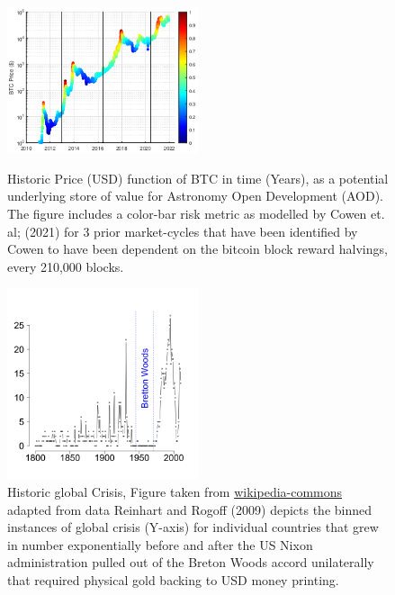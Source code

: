\documentclass[final,5p,times,twocolumn,authoryear]{elsarticle}
\begin{document}
 \begin{figure}[h!]
  \centering
  \caption{Historic Price (USD) function of BTC in time (Years), as a potential underlying store of value for Astronomy Open Development (AOD). The figure includes a color-bar risk metric as modelled by Cowen et. al; (2021) for 3 prior market-cycles that have been identified by Cowen to have been dependent on the bitcoin block reward halvings, every 210,000 blocks.}
  \includegraphics[width=0.5\textwidth]{figs/cowen2.eps}
  \label{fig:cowen}
  \end{figure}

\begin{figure}[h!]
    \centering
  \caption{Historic global Crisis, Figure taken from \href{https://en.wikipedia.org/wiki/Global_recession}{wikipedia-commons} adapted from data Reinhart and Rogoff (2009) depicts the binned instances of global crisis (Y-axis) for individual countries that grew in number exponentially before and after the US Nixon administration pulled out of the Breton Woods accord unilaterally that required physical gold backing to USD money printing.}
  \label{fig:crisis}
  \includegraphics[width=0.5\textwidth]{figs/330px-BankingCrises.svg.png}
\end{figure}
\end{document}
